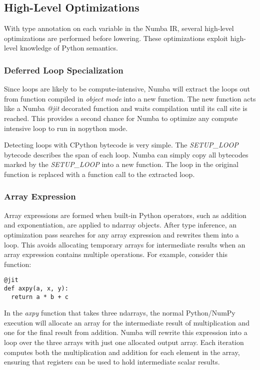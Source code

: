 \documentclass{acm_proc_article-sp}
\begin{document}
\subsection{High-Level Optimizations}

With type annotation on each variable in the Numba IR, several high-level
optimizations are performed before lowering. These optimizations exploit
high-level knowledge of Python semantics.

\subsubsection{Deferred Loop Specialization}

Since loops are likely to be compute-intensive, Numba will extract the
loops out from function compiled in \textit{object mode} into a new
function.  The new function acts like a Numba \textit{@jit} decorated
function and waits compilation until its call site is reached. This
provides a second chance for Numba to optimize any compute intensive
loop to run in nopython mode.

Detecting loops with CPython bytecode is very simple. The
\textit{SETUP\_LOOP} bytecode describes the span of each loop. Numba
can simply copy all bytecodes marked by the \textit{SETUP\-\_LOOP} into
a new function. The loop in the original function is replaced with a
function call to the extracted loop.

\subsubsection{Array Expression}

Array expressions are formed when built-in Python operators, such as
addition and exponentiation, are applied to ndarray objects. After
type inference, an optimization pass searches for any array expression
and rewrites them into a loop. This avoids allocating temporary arrays
for intermediate results when an array expression contains multiple
operations.  For example, consider this function:

\begin{lstlisting}
@jit
def axpy(a, x, y):
  return a * b + c
\end{lstlisting}

In the \textit{axpy} function that takes three ndarrays, the normal
Python/NumPy execution will allocate an array for the intermediate
result of multiplication and one for the final result from
addition. Numba will rewrite this expression into a loop over the
three arrays with just one allocated output array.  Each iteration
computes both the multiplication and addition for each element in the
array, ensuring that registers can be used to hold intermediate scalar
results.
\end{document}
